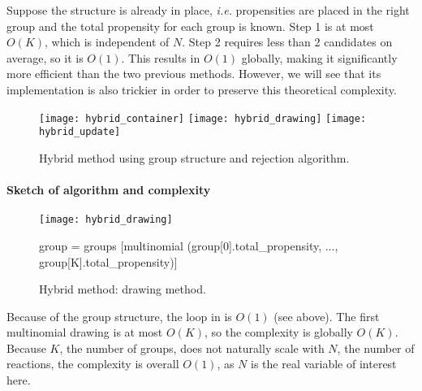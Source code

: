 Suppose the structure is already in place, \textit{i.e.} propensities are placed in the right group and the total propensity for each group is known. Step 1 is at most $O(K)$, which is independent of $N$. Step 2 requires less than 2 candidates on average, so it is $O(1)$. This results in $O(1)$ globally, making it significantly more efficient than the two previous methods. However, we will see that its implementation is also trickier in order to preserve this theoretical complexity.

\begin{figure}[!h]
  \centering
  \texttt{[image: hybrid\_container]}
  \texttt{[image: hybrid\_drawing]}
  \texttt{[image: hybrid\_update]}
  \caption {Hybrid method using group structure and rejection algorithm.}
  \label {fig:hybrid_method}
\end {figure}

\paragraph {Sketch of algorithm and complexity}

\begin{figure}[!h]
  \centering
  \begin{minipage}{\textwidth}
    \centering
    \texttt{[image: hybrid\_drawing]}
    \begin{algorithm}[H]
      \SetAlgoLined
      \KwData{$K+1$ groups, group k containing propensities whose value falls in the interval $(0,b]$ if k=0, $(2^{k-1}b, 2^kb]$ if k $>$ 0. Propensities are stored as a couple containing their value and original index.}
      group = groups [multinomial (group[0].total\_propensity, ...,
        group[K].total\_propensity)]\;
    \end{algorithm}
  \end{minipage}
  \caption{Hybrid method: drawing method.}
  \label{fig:hybrid_drawing}
\end{figure}

Because of the group structure, the loop in  is $O(1)$ (see above). The first multinomial drawing is at most $O(K)$, so the complexity is globally $O(K)$. Because $K$, the number of groups, does not naturally scale with $N$, the number of reactions, the complexity is overall $O(1)$, as $N$ is the real variable of interest here.


